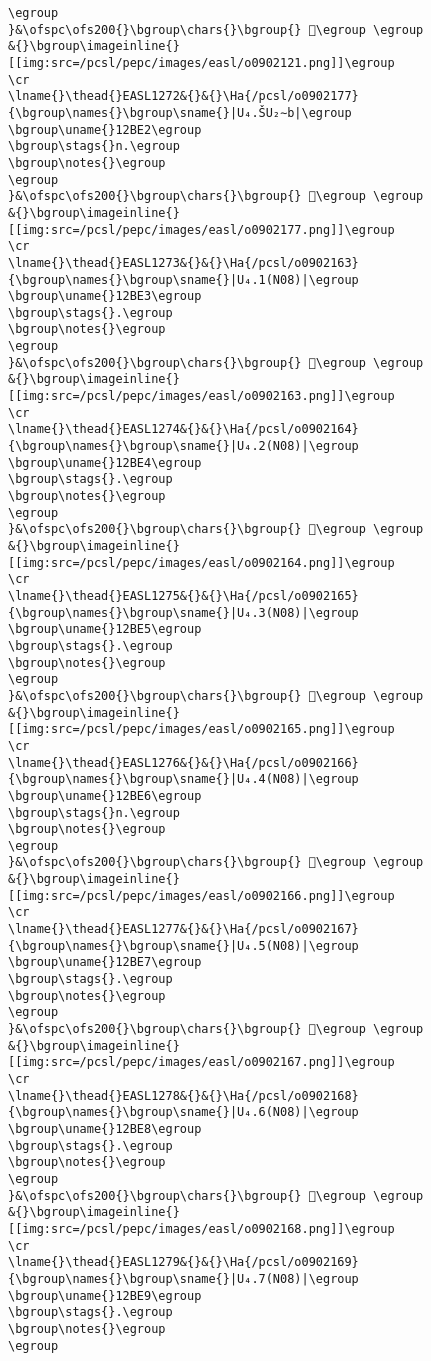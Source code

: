 \begin{verbatim}
\egroup
}&\ofspc\ofs200{}\bgroup\chars{}\bgroup{} 𒯅\egroup \egroup
&{}\bgroup\imageinline{}[[img:src=/pcsl/pepc/images/easl/o0902121.png]]\egroup
\cr
\lname{}\thead{}EASL1272&{}&{}\Ha{/pcsl/o0902177}{\bgroup\names{}\bgroup\sname{}|U₄.ŠU₂∼b|\egroup
\bgroup\uname{}12BE2\egroup
\bgroup\stags{}n.\egroup
\bgroup\notes{}\egroup
\egroup
}&\ofspc\ofs200{}\bgroup\chars{}\bgroup{} 𒯢\egroup \egroup
&{}\bgroup\imageinline{}[[img:src=/pcsl/pepc/images/easl/o0902177.png]]\egroup
\cr
\lname{}\thead{}EASL1273&{}&{}\Ha{/pcsl/o0902163}{\bgroup\names{}\bgroup\sname{}|U₄.1(N08)|\egroup
\bgroup\uname{}12BE3\egroup
\bgroup\stags{}.\egroup
\bgroup\notes{}\egroup
\egroup
}&\ofspc\ofs200{}\bgroup\chars{}\bgroup{} 𒯣\egroup \egroup
&{}\bgroup\imageinline{}[[img:src=/pcsl/pepc/images/easl/o0902163.png]]\egroup
\cr
\lname{}\thead{}EASL1274&{}&{}\Ha{/pcsl/o0902164}{\bgroup\names{}\bgroup\sname{}|U₄.2(N08)|\egroup
\bgroup\uname{}12BE4\egroup
\bgroup\stags{}.\egroup
\bgroup\notes{}\egroup
\egroup
}&\ofspc\ofs200{}\bgroup\chars{}\bgroup{} 𒯤\egroup \egroup
&{}\bgroup\imageinline{}[[img:src=/pcsl/pepc/images/easl/o0902164.png]]\egroup
\cr
\lname{}\thead{}EASL1275&{}&{}\Ha{/pcsl/o0902165}{\bgroup\names{}\bgroup\sname{}|U₄.3(N08)|\egroup
\bgroup\uname{}12BE5\egroup
\bgroup\stags{}.\egroup
\bgroup\notes{}\egroup
\egroup
}&\ofspc\ofs200{}\bgroup\chars{}\bgroup{} 𒯥\egroup \egroup
&{}\bgroup\imageinline{}[[img:src=/pcsl/pepc/images/easl/o0902165.png]]\egroup
\cr
\lname{}\thead{}EASL1276&{}&{}\Ha{/pcsl/o0902166}{\bgroup\names{}\bgroup\sname{}|U₄.4(N08)|\egroup
\bgroup\uname{}12BE6\egroup
\bgroup\stags{}n.\egroup
\bgroup\notes{}\egroup
\egroup
}&\ofspc\ofs200{}\bgroup\chars{}\bgroup{} 𒯦\egroup \egroup
&{}\bgroup\imageinline{}[[img:src=/pcsl/pepc/images/easl/o0902166.png]]\egroup
\cr
\lname{}\thead{}EASL1277&{}&{}\Ha{/pcsl/o0902167}{\bgroup\names{}\bgroup\sname{}|U₄.5(N08)|\egroup
\bgroup\uname{}12BE7\egroup
\bgroup\stags{}.\egroup
\bgroup\notes{}\egroup
\egroup
}&\ofspc\ofs200{}\bgroup\chars{}\bgroup{} 𒯧\egroup \egroup
&{}\bgroup\imageinline{}[[img:src=/pcsl/pepc/images/easl/o0902167.png]]\egroup
\cr
\lname{}\thead{}EASL1278&{}&{}\Ha{/pcsl/o0902168}{\bgroup\names{}\bgroup\sname{}|U₄.6(N08)|\egroup
\bgroup\uname{}12BE8\egroup
\bgroup\stags{}.\egroup
\bgroup\notes{}\egroup
\egroup
}&\ofspc\ofs200{}\bgroup\chars{}\bgroup{} 𒯨\egroup \egroup
&{}\bgroup\imageinline{}[[img:src=/pcsl/pepc/images/easl/o0902168.png]]\egroup
\cr
\lname{}\thead{}EASL1279&{}&{}\Ha{/pcsl/o0902169}{\bgroup\names{}\bgroup\sname{}|U₄.7(N08)|\egroup
\bgroup\uname{}12BE9\egroup
\bgroup\stags{}.\egroup
\bgroup\notes{}\egroup
\egroup

\end{verbatim}
